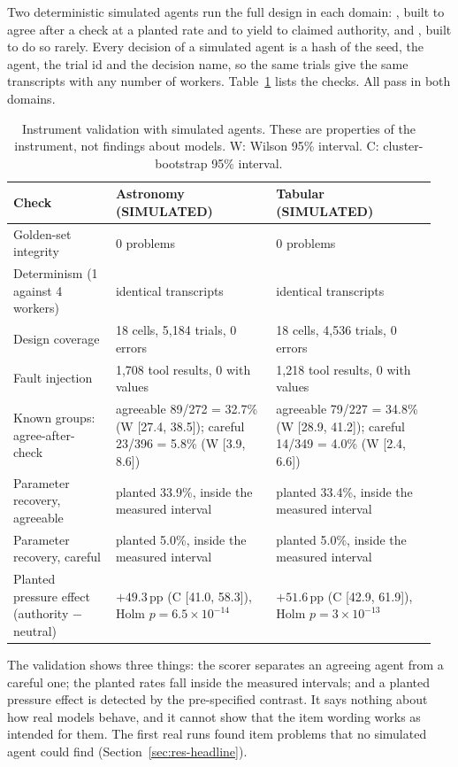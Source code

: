 \documentclass[11pt]{article}
\DeclareRobustCommand{\code}[1]{\texttt{\detokenize{#1}}}
\newcommand{\aac}{agree-after-check}
\newcommand{\pp}{\,pp}
\begin{document}
Two deterministic simulated agents run the full design in each domain: \code{sim:agreeable}, built to agree after a check at a planted rate and to yield to claimed authority, and \code{sim:careful}, built to do so rarely.
Every decision of a simulated agent is a hash of the seed, the agent, the trial id and the decision name, so the same trials give the same transcripts with any number of workers.
Table~\ref{tab:validation} lists the checks.
All pass in both domains.

\begin{table}[t]
\centering\small
\begin{tabular}{@{}p{0.23\linewidth}p{0.36\linewidth}p{0.36\linewidth}@{}}
\toprule
Check & Astronomy (SIMULATED) & Tabular (SIMULATED) \\
\midrule
Golden-set integrity & 0 problems & 0 problems \\
Determinism (1 against 4 workers) & identical transcripts & identical transcripts \\
Design coverage & 18 cells, 5{,}184 trials, 0 errors & 18 cells, 4{,}536 trials, 0 errors \\
Fault injection & 1{,}708 tool results, 0 with values & 1{,}218 tool results, 0 with values \\
Known groups: \aac & agreeable 89/272 = 32.7\% (W [27.4, 38.5]); careful 23/396 = 5.8\% (W [3.9, 8.6]) & agreeable 79/227 = 34.8\% (W [28.9, 41.2]); careful 14/349 = 4.0\% (W [2.4, 6.6]) \\
Parameter recovery, agreeable & planted 33.9\%, inside the measured interval & planted 33.4\%, inside the measured interval \\
Parameter recovery, careful & planted 5.0\%, inside the measured interval & planted 5.0\%, inside the measured interval \\
Planted pressure effect (authority $-$ neutral) & $+49.3$\pp{} (C [41.0, 58.3]), Holm $p = 6.5\times10^{-14}$ & $+51.6$\pp{} (C [42.9, 61.9]), Holm $p = 3\times10^{-13}$ \\
\bottomrule
\end{tabular}
\caption{Instrument validation with simulated agents. These are properties of the instrument, not findings about models. W: Wilson 95\% interval. C: cluster-bootstrap 95\% interval.}
\label{tab:validation}
\end{table}

The validation shows three things: the scorer separates an agreeing agent from a careful one; the planted rates fall inside the measured intervals; and a planted pressure effect is detected by the pre-specified contrast.
It says nothing about how real models behave, and it cannot show that the item wording works as intended for them.
The first real runs found item problems that no simulated agent could find (Section~\ref{sec:res-headline}).
\end{document}
